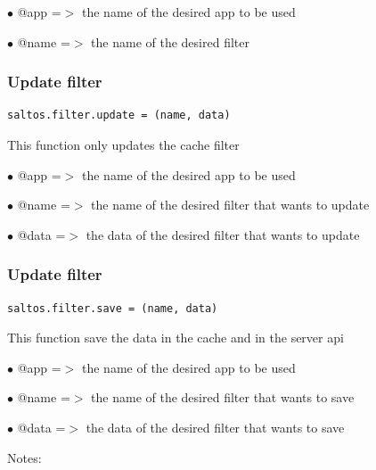 \documentclass[a4paper]{article}
\begin{document}
\begin{compactitem}
\item[\color{myblue}$\bullet$] @app  =$>$ the name of the desired app to be used
\item[\color{myblue}$\bullet$] @name =$>$ the name of the desired filter
\end{compactitem}

\hypertarget{toc212}{}
\subsubsection{Update filter}

\begin{lstlisting}
saltos.filter.update = (name, data)
\end{lstlisting}

This function only updates the cache filter

\begin{compactitem}
\item[\color{myblue}$\bullet$] @app  =$>$ the name of the desired app to be used
\item[\color{myblue}$\bullet$] @name =$>$ the name of the desired filter that wants to update
\item[\color{myblue}$\bullet$] @data =$>$ the data of the desired filter that wants to update
\end{compactitem}

\hypertarget{toc213}{}
\subsubsection{Update filter}

\begin{lstlisting}
saltos.filter.save = (name, data)
\end{lstlisting}

This function save the data in the cache and in the server api

\begin{compactitem}
\item[\color{myblue}$\bullet$] @app  =$>$ the name of the desired app to be used
\item[\color{myblue}$\bullet$] @name =$>$ the name of the desired filter that wants to save
\item[\color{myblue}$\bullet$] @data =$>$ the data of the desired filter that wants to save
\end{compactitem}

Notes:
\end{document}
